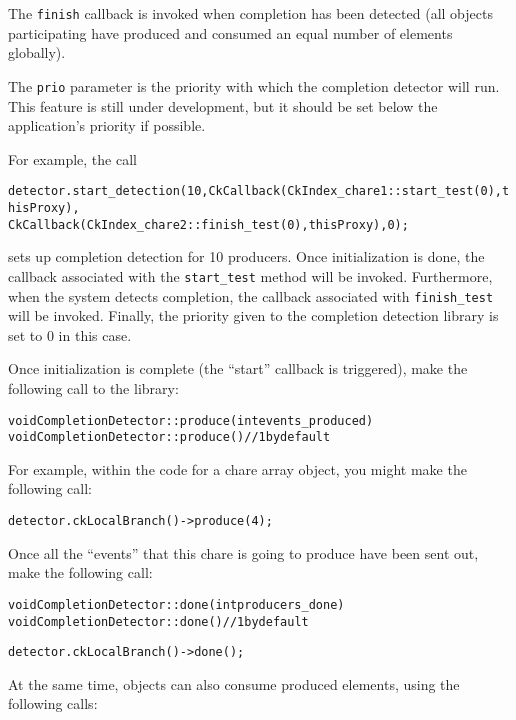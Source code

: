The \verb|finish| callback is invoked when completion has been
detected (all objects participating have produced and consumed an
equal number of elements globally).

The \verb|prio| parameter is the priority with which the completion detector will run. 
This feature is still under development, but it should be set below the
application's priority if possible.

For example, the call

\begin{alltt}
detector.start_detection(10, CkCallback(CkIndex_chare1::start_test(0), thisProxy),
                             CkCallback(CkIndex_chare2::finish_test(0), thisProxy), 0);
\end{alltt}

sets up completion detection for 10 producers. Once initialization is done, the callback 
associated with the {\tt start\_test} method will be invoked. Furthermore, when the system
detects completion, the callback associated with {\tt finish\_test} will be invoked. Finally,
the priority given to the completion detection library is set to 0 in this case.

Once initialization is complete (the ``start'' callback is triggered),
make the following call to the library:

\begin{alltt}
void CompletionDetector::produce(int events_produced)
void CompletionDetector::produce() // 1 by default
\end{alltt}

For example, within the code for a chare array object, you might make the following call:
\begin{alltt}
detector.ckLocalBranch()->produce(4);
\end{alltt}

Once all the ``events'' that this chare is going to produce have been sent out,
make the following call:

\begin{alltt}
void CompletionDetector::done(int producers_done)
void CompletionDetector::done() // 1 by default
\end{alltt}

\begin{alltt}
detector.ckLocalBranch()->done();
\end{alltt}

At the same time, objects can also consume produced elements, using the following calls:

